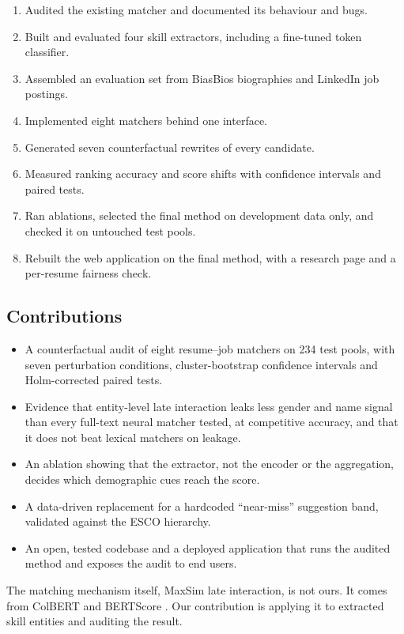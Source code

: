 \documentclass[conference,a4paper]{IEEEtran}
\begin{document}
\begin{enumerate}
\item Audited the existing matcher and documented its behaviour and bugs.
\item Built and evaluated four skill extractors, including a fine-tuned token classifier.
\item Assembled an evaluation set from BiasBios biographies and LinkedIn job postings.
\item Implemented eight matchers behind one interface.
\item Generated seven counterfactual rewrites of every candidate.
\item Measured ranking accuracy and score shifts with confidence intervals and paired tests.
\item Ran ablations, selected the final method on development data only, and checked it on untouched test pools.
\item Rebuilt the web application on the final method, with a research page and a per-resume fairness check.
\end{enumerate}
\subsection{Contributions}
\begin{itemize}
\item A counterfactual audit of eight resume–job matchers on 234 test pools, with seven perturbation conditions, cluster-bootstrap confidence intervals and Holm-corrected paired tests.
\item Evidence that entity-level late interaction leaks less gender and name signal than every full-text neural matcher tested, at competitive accuracy, and that it does not beat lexical matchers on leakage.
\item An ablation showing that the extractor, not the encoder or the aggregation, decides which demographic cues reach the score.
\item A data-driven replacement for a hardcoded ``near-miss'' suggestion band, validated against the ESCO hierarchy.
\item An open, tested codebase and a deployed application that runs the audited method and exposes the audit to end users.
\end{itemize}
The matching mechanism itself, MaxSim late interaction, is not ours. It comes from ColBERT \cite{colbert} and BERTScore \cite{bertscore}. Our contribution is applying it to extracted skill entities and auditing the result.
\end{document}
